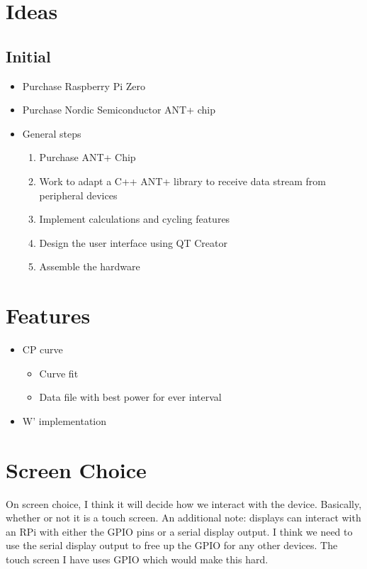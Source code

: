\documentclass[letterpaper]{article}
\begin{document}
\section{Ideas}

\subsection{Initial}


\begin{itemize}
   \item Purchase Raspberry Pi Zero
   \item Purchase Nordic Semiconductor ANT+ chip
   \item General steps
   \begin{enumerate}
      \item Purchase ANT+ Chip
      \item Work to adapt a C++ ANT+ library to receive data stream from peripheral devices
      \item Implement calculations and cycling features
      \item Design the user interface using QT Creator
      \item Assemble the hardware  
   \end{enumerate}
\end{itemize}


\section{Features}
\begin{itemize}
   \item CP curve
   \begin{itemize}
      \item Curve fit
      \item Data file with best power for ever interval
   \end{itemize}
   \item W' implementation
\end{itemize}



\section{Screen Choice}
On screen choice, I think it will decide how we interact with the device. Basically, whether or not it is a touch screen. An additional note: displays can interact with an RPi with either the GPIO pins or a serial display output. I think we need to use the serial display output to free up the GPIO for any other devices. The touch screen I have uses GPIO which would make this hard. 
\end{document}
